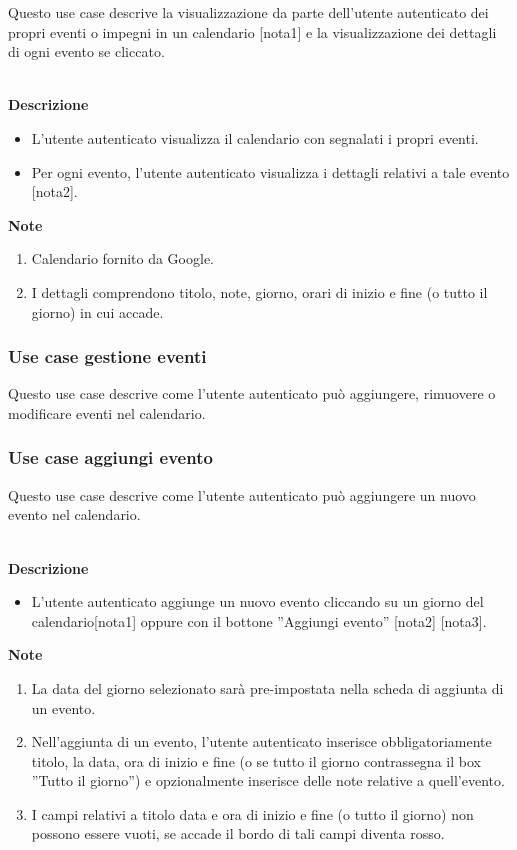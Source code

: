 \documentclass[a4paper,12pt]{article}
\begin{document}
Questo use case descrive la visualizzazione da parte dell'utente autenticato dei propri eventi o impegni in un calendario [nota1] e la visualizzazione dei dettagli di ogni evento se cliccato.

\textbf{\\Descrizione}
\begin{itemize} \setlength\itemsep{0.01em}
\item L'utente autenticato visualizza il calendario con segnalati i propri eventi.
\item Per ogni evento, l'utente autenticato visualizza i dettagli relativi a tale evento [nota2].
\end{itemize}

\textbf{Note}
\begin{enumerate} \setlength\itemsep{0.01em}
\item Calendario fornito da Google.
\item I dettagli comprendono titolo, note, giorno, orari di inizio e fine (o tutto il giorno) in cui accade.
\end{enumerate}

\subsubsection*{Use case gestione eventi}

Questo use case descrive come l'utente autenticato può aggiungere, rimuovere o modificare eventi nel calendario.




\subsubsection*{Use case aggiungi evento}

Questo use case descrive come l'utente autenticato può aggiungere un nuovo evento nel calendario.


\textbf{\\Descrizione}
\begin{itemize} \setlength\itemsep{0.01em}
\item L'utente autenticato aggiunge un nuovo evento cliccando su un giorno del calendario[nota1] oppure con il bottone ''Aggiungi evento'' [nota2] [nota3].
\end{itemize}

\textbf{Note}
\begin{enumerate} \setlength\itemsep{0.01em}
\item La data del giorno selezionato sarà pre-impostata nella scheda di aggiunta di un evento.
\item Nell'aggiunta di un evento, l'utente autenticato inserisce obbligatoriamente titolo, la data, ora di inizio e fine (o se tutto il giorno contrassegna il box ''Tutto il giorno'') e opzionalmente inserisce delle note relative a quell'evento.
\item I campi relativi a titolo data e ora di inizio e fine (o tutto il giorno) non possono essere vuoti, se accade il bordo di tali campi diventa rosso.
\end{enumerate}
\end{document}
